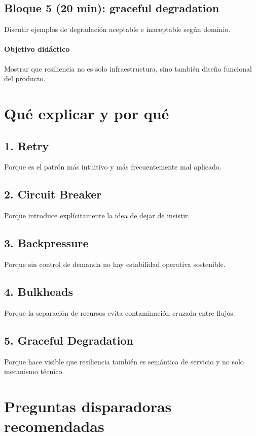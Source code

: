 \documentclass[variant=docente,cover=institutional,mode=screen]{ua-engineering-v6-article}
\begin{document}
\subsection*{Bloque 5 (20 min): graceful degradation}
Discutir ejemplos de degradación aceptable e inaceptable según dominio.

\paragraph{Objetivo didáctico}
Mostrar que resiliencia no es solo infraestructura, sino también diseño funcional del producto.

\section{Qué explicar y por qué}

\subsection*{1. Retry}
Porque es el patrón más intuitivo y más frecuentemente mal aplicado.

\subsection*{2. Circuit Breaker}
Porque introduce explícitamente la idea de dejar de insistir.

\subsection*{3. Backpressure}
Porque sin control de demanda no hay estabilidad operativa sostenible.

\subsection*{4. Bulkheads}
Porque la separación de recursos evita contaminación cruzada entre flujos.

\subsection*{5. Graceful Degradation}
Porque hace visible que resiliencia también es semántica de servicio y no solo mecanismo técnico.

\section{Preguntas disparadoras recomendadas}
\end{document}
